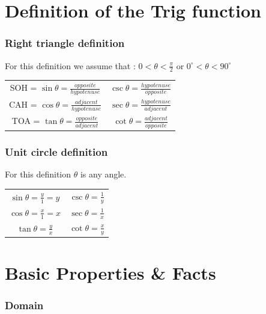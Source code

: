 \documentclass[10pt,onecolumn]{article}
\begin{document}
{\setlength{\parindent}{0cm}

\part{Definition of the Trig function}

\section{ Right triangle definition}

For this definition we assume that :
\(0 < \theta < \frac{\pi}{2}\) or \(0^{\circ} < \theta < 90^{\circ} \) \\
\begin{tabular}{c|c}
SOH = \(\sin \theta = \frac{opposite}{hypotenuse}\) & \(\csc \theta = \frac{hypotenuse}{opposite}\)  \\
CAH = \(\cos \theta = \frac{adjacent}{hypotenuse}\) & \(\sec \theta = \frac{hypotenuse}{adjacent}\) \\
TOA = \(\tan \theta = \frac{opposite}{adjacent}\) & \(\cot \theta = \frac{adjacent}{opposite}\)  \\
\end{tabular}
\section{Unit circle definition}

For this definition \(\theta\) is any angle.  \\

\begin{tabular}{c|c}
\(\sin \theta = \frac{y}{1} = y \)  & \(\csc \theta = \frac{1}{y} \) \\
\(\cos \theta = \frac{x}{1} = x \) & \(\sec \theta = \frac{1}{x}\) \\
\(\tan \theta = \frac{y}{x} \) & \(\cot \theta = \frac{x}{y}\) \\
\end{tabular}

\part{Basic Properties \& Facts}

\section{Domain}

}
\end{document}
